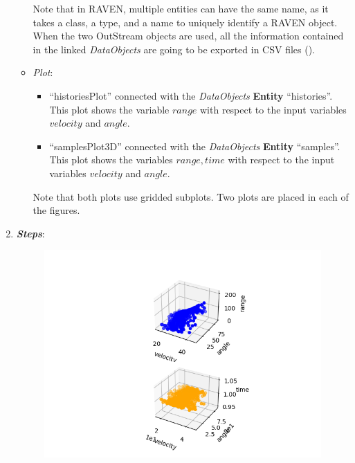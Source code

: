 \begin{enumerate}
\begin{itemize}
\begin{itemize}
     \end{itemize}
     Note that in RAVEN, multiple entities can have the same name, as it takes a class, a type, and a name to uniquely identify a RAVEN object. When the two OutStream objects are used, all the information contained in the  linked \textit{DataObjects} are going
    to be exported in CSV files ().
    \item \textit{Plot}:
    \begin{itemize}
      \item ``historiesPlot'' connected with the  \textit{DataObjects}
      \textbf{Entity} ``histories''.  This plot shows the variable $range$ with respect to the input variables $velocity$ and $angle$.
      \item ``samplesPlot3D'' connected with the
      \textit{DataObjects} \textbf{Entity} ``samples''. This plot shows the variables $range,time$ with respect to the input variables $velocity$ and $angle$.
    \end{itemize}
     Note that both plots use gridded subplots. Two plots
     are placed in each of the figures.
  \end{itemize}
   \item \textbf{\textit{Steps}}:
 \begin{figure}[h!]
  \centering
  \includegraphics[scale=0.7]{../../tests/framework/user_guide/ForwardSamplingStrategies/gold/RunDir/MonteCarlo/1-samplesPlot3D_scatter-scatter.png}

\end{figure}
\end{enumerate}
